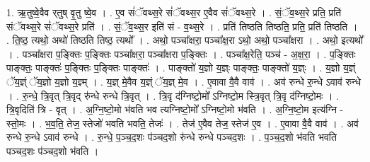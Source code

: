 \documentclass[17pt]{extarticle}
\begin{document}
1. ऋ॒तुष्वे॒वैव र्‌तुष् वृ॒तु ष्वे॒व । . ए॒व सं॑ॅवथ्स॒रे सं॑ॅवथ्स॒र ए॒वैव सं॑ॅवथ्स॒रे । . सं॒ॅव॒थ्स॒रे प्रति॒ प्रति॑ संॅवथ्स॒रे सं॑ॅवथ्स॒रे प्रति॑ । . सं॒ॅव॒थ्स॒र इति॑ सं - व॒थ्स॒रे । . प्रति॑ तिष्ठति तिष्ठति॒ प्रति॒ प्रति॑ तिष्ठति । . ति॒ष्ठ॒ त्यथो॒ अथो॑ तिष्ठति तिष्ठ॒ त्यथो᳚ । . अथो॒ पञ्चा᳚क्षरा॒ पञ्चा᳚क्ष॒रा ऽथो॒ अथो॒ पञ्चा᳚क्षरा । . अथो॒ इत्यथो᳚ । . पञ्चा᳚क्षरा प॒ङ्क्तिः प॒ङ्क्तिः पञ्चा᳚क्षरा॒ पञ्चा᳚क्षरा प॒ङ्क्तिः । . पञ्चा᳚क्ष॒रेति॒ पञ्च॑ - अ॒क्ष॒रा॒ । . प॒ङ्क्तिः पाङ्क्तः॒ पाङ्क्तः॑ प॒ङ्क्तिः प॒ङ्क्तिः पाङ्क्तः॑ । . पाङ्क्तो॑ य॒ज्ञो य॒ज्ञ्ः पाङ्क्तः॒ पाङ्क्तो॑ य॒ज्ञ्ः । . य॒ज्ञो य॒ज्ञ्ं ॅय॒ज्ञ्ं ॅय॒ज्ञो य॒ज्ञो य॒ज्ञ्म् । . य॒ज्ञ् मे॒वैव य॒ज्ञ्ं ॅय॒ज्ञ् मे॒व । . ए॒वावा वै॒वै वाव॑ । . अव॑ रुन्धे रु॒न्धे ऽवाव॑ रुन्धे । . रु॒न्धे॒ त्रि॒वृत् त्रि॒वृद् रु॑न्धे रुन्धे त्रि॒वृत् । . त्रि॒वृ द॑ग्निष्टो॒मो᳚ ऽग्निष्टो॒म स्त्रि॒वृत् त्रि॒वृ द॑ग्निष्टो॒मः । . त्रि॒वृदिति॑ त्रि - वृत् । . अ॒ग्नि॒ष्टो॒मो भ॑वति भव त्यग्निष्टो॒मो᳚ ऽग्निष्टो॒मो भ॑वति । . अ॒ग्नि॒ष्टो॒म इत्य॑ग्नि - स्तो॒मः । . भ॒व॒ति॒ तेज॒ स्तेजो॑ भवति भवति॒ तेजः॑ । . तेज॑ ए॒वैव तेज॒ स्तेज॑ ए॒व । . ए॒वावा वै॒वै वाव॑ । . अव॑ रुन्धे रु॒न्धे ऽवाव॑ रुन्धे । . रु॒न्धे॒ प॒ञ्च॒द॒शः प॑ञ्चद॒शो रु॑न्धे रुन्धे पञ्चद॒शः । . प॒ञ्च॒द॒शो भ॑वति भवति पञ्चद॒शः प॑ञ्चद॒शो भ॑वति । \newline
\end{document}
